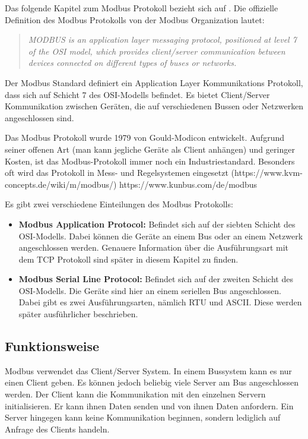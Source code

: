 Das folgende Kapitel zum Modbus Protokoll bezieht sich auf \cite{Modbus_Organization_AP:2012, Modbus_Organization_SL:2012}. \newline Die offizielle Definition des Modbus Protokolls von der Modbus Organization \cite{Modbus_Organization_AP:2012} lautet:
\begin{quotation}
	\emph{
		MODBUS is an application layer messaging protocol, positioned at level 7 of the OSI model, which provides client/server communication between devices connected on different types of buses or networks.}
\end{quotation}

Der Modbus Standard definiert ein Application Layer Kommunikations Protokoll, dass sich auf Schicht 7 des OSI-Modells befindet. Es bietet Client/Server Kommunikation zwischen Geräten, die auf verschiedenen Bussen oder Netzwerken angeschlossen sind.

Das Modbus Protokoll wurde 1979 von Gould-Modicon entwickelt. Aufgrund seiner offenen Art (man kann jegliche Geräte als Client anhängen) und geringer Kosten, ist das Modbus-Protokoll immer noch ein Industriestandard. Besonders oft wird das Protokoll in Mess- und Regelsystemen eingesetzt (https://www.kvm-concepts.de/wiki/m/modbus/)
https://www.kunbus.com/de/modbus 

Es gibt zwei verschiedene Einteilungen des Modbus Protokolls: 
\begin{itemize}
\item \textbf{Modbus Application Protocol:} Befindet sich auf der siebten Schicht des OSI-Modells. Dabei können die Geräte an einem Bus oder an einem Netzwerk angeschlossen werden. Genauere Information über die Ausführungsart mit dem TCP Protokoll sind später in diesem Kapitel zu finden.
\item \textbf{Modbus Serial Line Protocol:} Befindet sich auf der zweiten Schicht des OSI-Modells. Die Geräte sind hier an einem seriellen Bus angeschlossen. Dabei gibt es zwei Ausführungsarten, nämlich RTU und ASCII. Diese werden später ausführlicher beschrieben.
\end{itemize}

\subsection{Funktionsweise}
Modbus verwendet das Client/Server System. In einem Bussystem kann es nur einen Client geben. Es können jedoch beliebig viele Server am Bus angeschlossen werden. Der Client kann die Kommunikation mit den einzelnen Servern initialisieren. Er kann ihnen Daten senden und von ihnen Daten anfordern. Ein Server hingegen kann keine Kommunikation beginnen, sondern lediglich auf Anfrage des Clients handeln.

